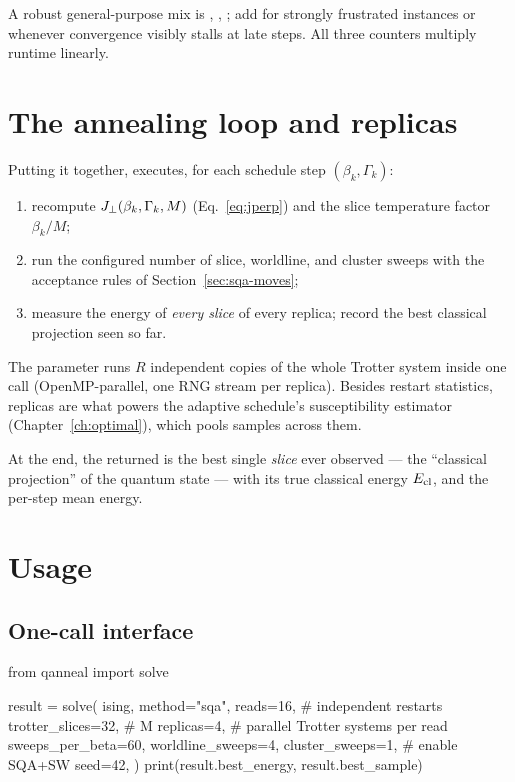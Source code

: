 \begin{notebox}
A robust general-purpose mix is
, ,
; add  for strongly
frustrated instances or whenever convergence visibly stalls at late steps.
All three counters multiply runtime linearly.
\end{notebox}

\section{The annealing loop and replicas}

Putting it together,  executes, for each schedule
step $(\beta_k,\Gamma_k)$:
\begin{enumerate}
\item recompute $J_{\perp}(\beta_k,\Gamma_k,M)$ (Eq.~\eqref{eq:jperp}) and the
slice temperature factor $\beta_k/M$;
\item run the configured number of slice, worldline, and cluster sweeps with
the acceptance rules of Section~\ref{sec:sqa-moves};
\item measure the energy of \emph{every slice} of every replica; record the
best classical projection seen so far.
\end{enumerate}

The  parameter runs $R$ independent copies of the whole
Trotter system inside one call (OpenMP-parallel, one RNG stream per replica).
Besides restart statistics, replicas are what powers the adaptive schedule's
susceptibility estimator (Chapter~\ref{ch:optimal}), which pools samples
across them.

At the end, the returned  is the best single \emph{slice}
ever observed --- the ``classical projection'' of the quantum state --- with
 its true classical energy $E_{\mathrm{cl}}$, and
 the per-step mean energy.

\section{Usage}

\subsection{One-call interface}

\begin{pycode}
from qanneal import solve

result = solve(
    ising,
    method="sqa",
    reads=16,             # independent restarts
    trotter_slices=32,    # M
    replicas=4,           # parallel Trotter systems per read
    sweeps_per_beta=60,
    worldline_sweeps=4,
    cluster_sweeps=1,     # enable SQA+SW
    seed=42,
)
print(result.best_energy, result.best_sample)
\end{pycode}

